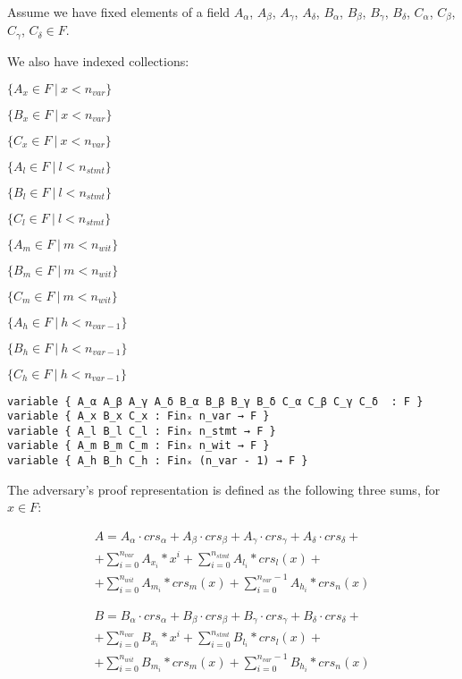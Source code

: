 \documentclass{article}
\theoremstyle{definition}
\theoremstyle{remark}
\begin{document}
Assume we have fixed elements of a field $A_{\alpha}$, $A_{\beta}$, $A_{\gamma}$, $A_{\delta}$, $B_{\alpha}$, $B_{\beta}$, $B_{\gamma}$, $B_{\delta}$, $C_{\alpha}$, $C_{\beta}$, $C_{\gamma}$, $C_{\delta} \in F$.

We also have indexed collections:
\begin{center}
$\{ A_x \in F \: | \: x < n_{var} \}$

$\{ B_x \in F \: | \: x < n_{var} \}$

$\{ C_x \in F \: | \: x < n_{var} \}$

$\{ A_l \in F \: | \: l < n_{stmt} \}$

$\{ B_l \in F \: | \: l < n_{stmt} \}$

$\{ C_l \in F \: | \: l < n_{stmt} \}$

$\{ A_m \in F \: | \: m < n_{wit} \}$

$\{ B_m \in F \: | \: m < n_{wit} \}$

$\{ C_m \in F \: | \: m < n_{wit} \}$

$\{ A_h \in F \: | \: h < n_{var - 1} \}$

$\{ B_h \in F \: | \: h < n_{var - 1} \}$

$\{ C_h \in F \: | \: h < n_{var - 1} \}$
\end{center}

\begin{lstlisting}
variable { A_α A_β A_γ A_δ B_α B_β B_γ B_δ C_α C_β C_γ C_δ  : F }
variable { A_x B_x C_x : Finₓ n_var → F }
variable { A_l B_l C_l : Finₓ n_stmt → F }
variable { A_m B_m C_m : Finₓ n_wit → F }
variable { A_h B_h C_h : Finₓ (n_var - 1) → F }
\end{lstlisting}

The adversary's proof representation is defined as the following three sums, for $x \in F$:

\begin{multline}
A = A_{\alpha} \cdot crs_{\alpha} + A_{\beta} \cdot crs_{\beta} + A_{\gamma} \cdot crs_{\gamma} + A_{\delta} \cdot crs_{\delta} + \\
    + \sum \limits_{i = 0}^{n_{var}} A_{x_i} * x^i + \sum \limits_{i = 0}^{n_{stmt}} A_{l_i} * crs_l(x) + \\
    + \sum \limits_{i = 0}^{n_{wit}} A_{m_i} * crs_m(x) + \sum \limits_{i = 0}^{n_{var} - 1} A_{h_i} * crs_n(x)
\end{multline}

\begin{multline}
B = B_{\alpha} \cdot crs_{\alpha} + B_{\beta} \cdot crs_{\beta} + B_{\gamma} \cdot crs_{\gamma} + B_{\delta} \cdot crs_{\delta} + \\
    + \sum \limits_{i = 0}^{n_{var}} B_{x_i} * x^i + \sum \limits_{i = 0}^{n_{stmt}} B_{l_i} * crs_l(x) + \\
    + \sum \limits_{i = 0}^{n_{wit}} B_{m_i} * crs_m(x) + \sum \limits_{i = 0}^{n_{var} - 1} B_{h_i} * crs_n(x)
\end{multline}
\end{document}
